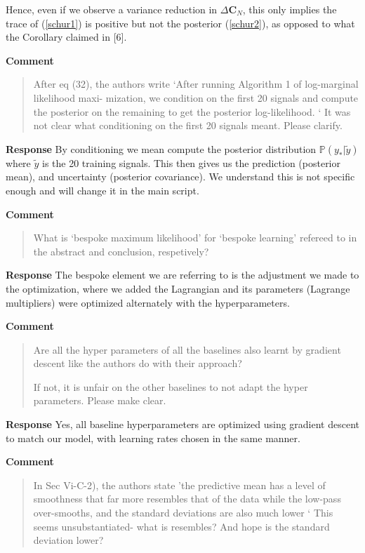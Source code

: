 \documentclass[11pt,onecolumn,journal]{IEEEtran}
\theoremstyle{definition}
\begin{document}
Hence, even if we observe a variance reduction in $\Delta \mathbf{C}_N$, this only implies the trace of (\ref{schur1}) is positive but not the posterior (\ref{schur2}), as opposed to what the Corollary claimed in [6].

\textbf{Comment}
\begin{quote}
After eq (32), the authors write ‘After running Algorithm 1 of log-marginal likelihood maxi- mization, we condition on the first 20 signals and compute the posterior on the remaining to get the posterior log-likelihood. ‘ It was not clear what conditioning on the first 20 signals meant. Please clarify.
\end{quote}

\textbf{Response}
By conditioning we mean compute the posterior distribution $\mathbb{P}(y_* | \tilde{y})$ where $\tilde{y}$ is the 20 training signals. This then gives us the prediction (posterior mean), and uncertainty (posterior covariance). We understand this is not specific enough and will change it in the main script.

\textbf{Comment}
\begin{quote}
    What is ‘bespoke maximum likelihood’ for ‘bespoke learning’ refereed to in the abstract and conclusion, respetively?
\end{quote}

\textbf{Response}
The bespoke element we are referring to is the adjustment we made to the optimization, where we added the Lagrangian and its parameters (Lagrange multipliers) were optimized alternately with the hyperparameters.

\textbf{Comment}
\begin{quote}
    Are all the hyper parameters of all the baselines also learnt by gradient descent like the authors do with their approach?
    
    If not, it is unfair on the other baselines to not adapt the hyper parameters. Please make clear.
\end{quote}

\textbf{Response}
Yes, all baseline hyperparameters are optimized using gradient descent to match our model, with learning rates chosen in the same manner.

\textbf{Comment}
\begin{quote}
In Sec Vi-C-2), the authors state 'the predictive mean has a level of smoothness that far more resembles that of the data while the low-pass over-smooths, and the standard deviations are also much lower
‘ This seems unsubstantiated- what is resembles? And hope is the standard deviation lower?
\end{quote}
\end{document}
